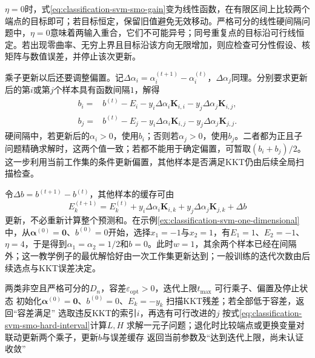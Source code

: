 $\eta=0$时，式\eqref{eq:classification-svm-smo-gain}变为线性函数，在有限区间上比较两个端点的目标即可；若目标恒定，保留旧值避免无效移动。严格可分的线性硬间隔问题中，$\eta=0$意味着两输入重合，它们不可能异号；同号重复点的目标沿可行线恒定。若出现零曲率、无穷上界且目标沿该方向无限增加，则应检查可分性假设、核矩阵与数值误差，并停止该次更新。

乘子更新以后还要调整偏置。记$\Delta\alpha_i=\alpha_i^{(t+1)}-\alpha_i^{(t)}$，$\Delta\alpha_j$同理。分别要求更新后的第$i$或第$j$个样本具有函数间隔$1$，解得
\begin{equation}
  \begin{aligned}
    b_i={}&b^{(t)}-E_i
       -y_i\Delta\alpha_i\bm{K}_{i,i}
       -y_j\Delta\alpha_j\bm{K}_{i,j},\\
    b_j={}&b^{(t)}-E_j
       -y_i\Delta\alpha_i\bm{K}_{i,j}
       -y_j\Delta\alpha_j\bm{K}_{j,j}.
  \end{aligned}
  \label{eq:classification-svm-smo-bias}
\end{equation}
硬间隔中，若更新后的$\alpha_i>0$，使用$b_i$；否则若$\alpha_j>0$，使用$b_j$。二者都为正且子问题精确求解时，这两个值一致；若都不能用于确定偏置，可暂取$(b_i+b_j)/2$。这一步利用当前工作集的条件更新偏置，其他样本是否满足KKT仍由后续全局扫描检查。

令$\Delta b=b^{(t+1)}-b^{(t)}$，其他样本的缓存可由
\[
  E_k^{(t+1)}
  =E_k^{(t)}
   +y_i\Delta\alpha_i\bm{K}_{i,k}
   +y_j\Delta\alpha_j\bm{K}_{j,k}
   +\Delta b
\]
更新，不必重新计算整个预测和。在示例\ref{ex:classification-svm-one-dimensional}中，从$\bm{\alpha}^{(0)}=\bm{0}$、$b^{(0)}=0$开始，选择$x_1=-1$与$x_2=1$，有$E_1=1$、$E_2=-1$、$\eta=4$，于是得到$\alpha_1=\alpha_2=1/2$和$b=0$。此时$w=1$，其余两个样本已经在间隔外；这一教学例子的最优解恰好由一次工作集更新达到；一般训练的迭代次数由后续选点与KKT误差决定。

\begin{algorithm}[硬间隔SMO的训练框架]
  \label{alg:classification-svm-smo}
  \begin{algorithmic}[1]
    \Require 两类非空且严格可分的$D_n$，容差$\varepsilon_{\mathrm{opt}}>0$，迭代上限$t_{\max}$
    \Ensure 可行乘子、偏置及停止状态
    \State 初始化$\bm{\alpha}^{(0)}=\bm{0}$、$b^{(0)}=0$、$E_k=-y_k$
      \State 扫描KKT残差；若全部低于容差，返回“容差满足”
      \State 选取违反KKT的索引$i$，再选有可行改进的$j$
      \State 按式\eqref{eq:classification-svm-smo-hard-interval}计算$L,H$
      \State 求解一元子问题；退化时比较端点或更换变量对
      \State 联动更新两个乘子，更新$b$与误差缓存
    \EndFor
    \State 返回当前参数及“达到迭代上限，尚未认证收敛”
  \end{algorithmic}
\end{algorithm}

